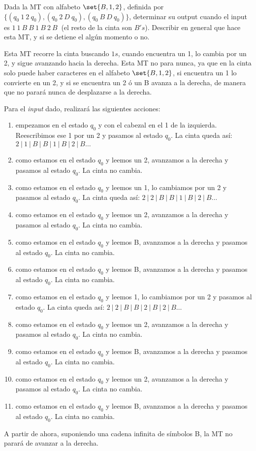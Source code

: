 \begin{problem}
Dada la MT con alfabeto $\set{B, 1, 2}$, definida por $\{(q_0 \ 1 \ 2 \ q_0), (q_0 \ 2 \ D \ q_0),  (q_0 \ B \ D \ q_0)\}$,
determinar su output cuando el input es $1 \ 1  \ B \ B \ 1 \  B  \ 2  \ B \ $ (el resto de la cinta son $B's$). Describir en general que hace esta MT, y si se detiene el algún momento o no.

\solution
Esta MT recorre la cinta buscando $1s$, cuando encuentra un 1, lo cambia por un 2, y sigue avanzando hacia la derecha. Esta MT no para nunca, ya que en la cinta solo puede haber caracteres en el alfabeto $\set{B, 1, 2}$, si encuentra un 1 lo convierte en un 2, y si se encuentra un 2 ó un B avanza a la derecha, de manera que no parará nunca de desplazarse a la derecha.

Para el {\it input} dado, realizará las siguientes acciones:

\begin{enumerate}
	\item empezamos en el estado $q_0$ y con el cabezal en el 1 de la izquierda. Reescribimos ese 1 por un 2 y pasamos al estado $q_0$. La cinta queda así: $2 \ |\ 1  \ |\ B \ |\ B \ |\ 1 \ |\  B  \ |\ 2  \ |\ B \dots$
	\item como estamos en el estado $q_0$ y leemos un 2, avanzamos a la derecha y pasamos al estado $q_0$. La cinta no cambia.
	\item como estamos en el estado $q_0$ y leemos un 1, lo cambiamos por un 2 y pasamos al estado $q_0$. La cinta queda así: $2 \ |\ 2 \ |\ B \ |\ B \ |\ 1 \ |\  B  \ |\ 2  \ |\ B \dots$
	\item como estamos en el estado $q_0$ y leemos un 2, avanzamos a la derecha y pasamos al estado $q_0$. La cinta no cambia.
	\item como estamos en el estado $q_0$ y leemos B, avanzamos a la derecha y pasamos al estado $q_0$. La cinta no cambia.
	\item como estamos en el estado $q_0$ y leemos B, avanzamos a la derecha y pasamos al estado $q_0$. La cinta no cambia.
	\item como estamos en el estado $q_0$ y leemos 1, lo cambiamos por un 2 y pasamos al estado $q_0$. La cinta queda así: $2 \ |\ 2 \ |\ B \ |\ B \ |\ 2 \ |\  B  \ |\ 2  \ |\ B \dots$
	\item como estamos en el estado $q_0$ y leemos un 2, avanzamos a la derecha y pasamos al estado $q_0$. La cinta no cambia.
	\item como estamos en el estado $q_0$ y leemos B, avanzamos a la derecha y pasamos al estado $q_0$. La cinta no cambia.
	\item como estamos en el estado $q_0$ y leemos un 2, avanzamos a la derecha y pasamos al estado $q_0$. La cinta no cambia.
	\item como estamos en el estado $q_0$ y leemos B, avanzamos a la derecha y pasamos al estado $q_0$. La cinta no cambia.
\end{enumerate}

A partir de ahora, suponiendo una cadena infinita de símbolos B, la MT no parará de avanzar a la derecha.

\end{problem}


